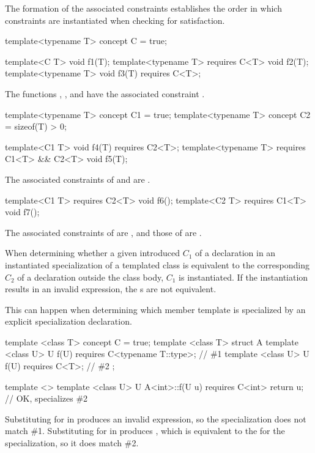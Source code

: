 The formation of the associated constraints
establishes the order in which constraints are instantiated when checking
for satisfaction.
\begin{example}
\begin{codeblock}
template<typename T> concept C = true;

template<C T> void f1(T);
template<typename T> requires C<T> void f2(T);
template<typename T> void f3(T) requires C<T>;
\end{codeblock}
The functions , , and  have the associated
constraint .

\begin{codeblock}
template<typename T> concept C1 = true;
template<typename T> concept C2 = sizeof(T) > 0;

template<C1 T> void f4(T) requires C2<T>;
template<typename T> requires C1<T> && C2<T> void f5(T);
\end{codeblock}
The associated constraints of  and 
are .

\begin{codeblock}
template<C1 T> requires C2<T> void f6();
template<C2 T> requires C1<T> void f7();
\end{codeblock}
The associated constraints of
 are ,
and those of
 are .
\end{example}

\pnum
When determining whether a given introduced
 $C_1$ of a declaration
in an instantiated specialization of a templated class
is equivalent to the corresponding
 $C_2$ of a declaration
outside the class body,
$C_1$ is instantiated.
If the instantiation results in an invalid expression,
the s are not equivalent.
\begin{note}
This can happen when determining which member template is specialized
by an explicit specialization declaration.
\end{note}
\begin{example}
\begin{codeblock}
template <class T> concept C = true;
template <class T> struct A {
  template <class U> U f(U) requires C<typename T::type>;   // \#1
  template <class U> U f(U) requires C<T>;                  // \#2
};

template <> template <class U>
U A<int>::f(U u) requires C<int> { return u; }              // OK, specializes \#2
\end{codeblock}
Substituting  for  in 
produces an invalid expression, so the specialization does not match \#1.
Substituting  for  in  produces ,
which is equivalent to the  for the specialization,
so it does match \#2.
\end{example}

